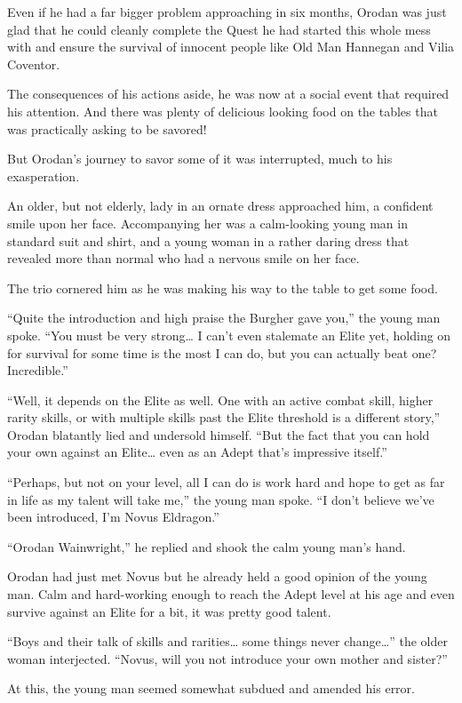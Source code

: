 \documentclass[a4paper,10pt]{book}
\begin{document}
Even if he had a far bigger problem approaching in six months, Orodan was just glad that he could cleanly complete the Quest he had started this whole mess with and ensure the survival of innocent people like Old Man Hannegan and Vilia Coventor.\par
The consequences of his actions aside, he was now at a social event that required his attention. And there was plenty of delicious looking food on the tables that was practically asking to be savored!\par
But Orodan’s journey to savor some of it was interrupted, much to his exasperation.\par
An older, but not elderly, lady in an ornate dress approached him, a confident smile upon her face. Accompanying her was a calm-looking young man in standard suit and shirt, and a young woman in a rather daring dress that revealed more than normal who had a nervous smile on her face.\par
The trio cornered him as he was making his way to the table to get some food.\par
“Quite the introduction and high praise the Burgher gave you,” the young man spoke. “You must be very strong… I can’t even stalemate an Elite yet, holding on for survival for some time is the most I can do, but you can actually beat one? Incredible.”\par
“Well, it depends on the Elite as well. One with an active combat skill, higher rarity skills, or with multiple skills past the Elite threshold is a different story,” Orodan blatantly lied and undersold himself. “But the fact that you can hold your own against an Elite… even as an Adept that’s impressive itself.”\par
“Perhaps, but not on your level, all I can do is work hard and hope to get as far in life as my talent will take me,” the young man spoke. “I don’t believe we’ve been introduced, I’m Novus Eldragon.”\par
“Orodan Wainwright,” he replied and shook the calm young man’s hand.\par
Orodan had just met Novus but he already held a good opinion of the young man. Calm and hard-working enough to reach the Adept level at his age and even survive against an Elite for a bit, it was pretty good talent.\par
“Boys and their talk of skills and rarities… some things never change…” the older woman interjected. “Novus, will you not introduce your own mother and sister?”\par
At this, the young man seemed somewhat subdued and amended his error.\par
\end{document}
